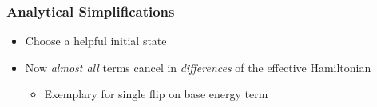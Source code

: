     \begin{frame}[t]
        \frametitle{Analytical Simplifications}
        
        \begin{itemize}
            \item Choose a helpful initial state
        \end{itemize}
    
        \pause
        \vspace{-0.35cm}

        \vspace{-0.1cm}
        \begin{itemize}
            \item Now \emph{almost all} terms cancel in \emph{differences} of the effective Hamiltonian \pause
            \begin{itemize}
                \item Exemplary for single flip on base energy term
            \end{itemize} 
        \end{itemize}

        \vspace{-0.15cm}

        \onslide %
    \end{frame}
